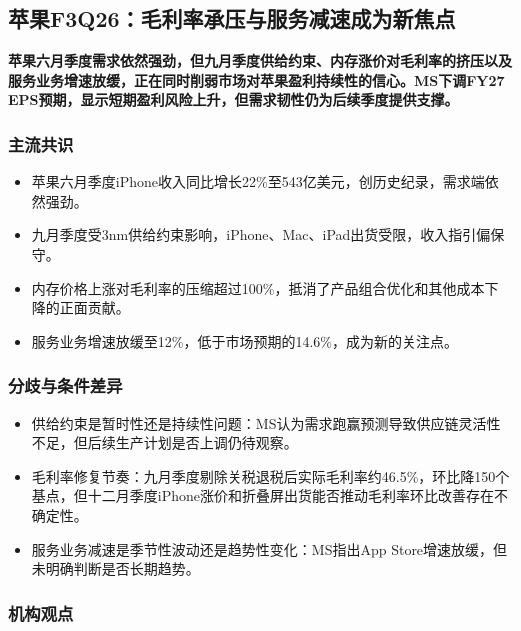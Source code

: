 \documentclass[11pt]{ctexart}
\begin{document}
\subsection{苹果F3Q26：毛利率承压与服务减速成为新焦点}
\textbf{苹果六月季度需求依然强劲，但九月季度供给约束、内存涨价对毛利率的挤压以及服务业务增速放缓，正在同时削弱市场对苹果盈利持续性的信心。MS下调FY27 EPS预期，显示短期盈利风险上升，但需求韧性仍为后续季度提供支撑。}
\subsubsection*{主流共识}
\begin{itemize}
  \item 苹果六月季度iPhone收入同比增长22\%至543亿美元，创历史纪录，需求端依然强劲。
  \item 九月季度受3nm供给约束影响，iPhone、Mac、iPad出货受限，收入指引偏保守。
  \item 内存价格上涨对毛利率的压缩超过100\%，抵消了产品组合优化和其他成本下降的正面贡献。
  \item 服务业务增速放缓至12\%，低于市场预期的14.6\%，成为新的关注点。
\end{itemize}
\subsubsection*{分歧与条件差异}
\begin{itemize}
  \item 供给约束是暂时性还是持续性问题：MS认为需求跑赢预测导致供应链灵活性不足，但后续生产计划是否上调仍待观察。
  \item 毛利率修复节奏：九月季度剔除关税退税后实际毛利率约46.5\%，环比降150个基点，但十二月季度iPhone涨价和折叠屏出货能否推动毛利率环比改善存在不确定性。
  \item 服务业务减速是季节性波动还是趋势性变化：MS指出App Store增速放缓，但未明确判断是否长期趋势。
\end{itemize}
\subsubsection*{机构观点}
\end{document}
